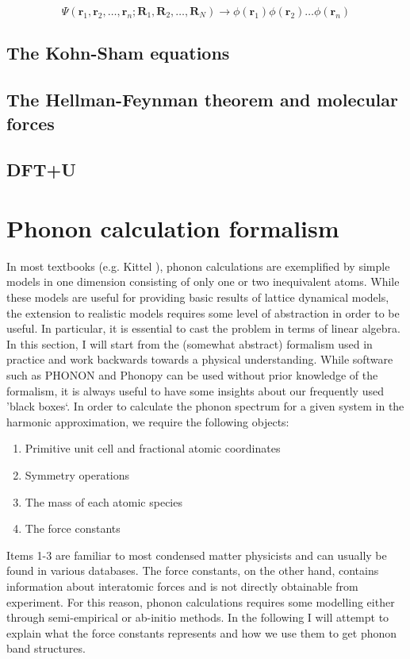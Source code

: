 \[ \Psi(\bm{r}_1,\bm{r}_2,\dots, \bm{r}_n; \bm{R}_1, \bm{R}_2, \dots , \bm{R}_N) \longrightarrow \phi(\bm{r}_1)\phi(\bm{r}_2)\dots\phi(\bm{r}_n) \]

\subsection{The Kohn-Sham equations}

\subsection{The Hellman-Feynman theorem and molecular forces}

\subsection{DFT+U}

\section{Phonon calculation formalism}
In most textbooks (e.g. Kittel \cite{Kittel2005}), phonon calculations are exemplified by simple models in one dimension consisting of only one or two inequivalent atoms. While these models are useful for providing basic results of lattice dynamical models, the extension to realistic models requires some level of abstraction in order to be useful. In particular, it is essential to cast the problem in terms of linear algebra. In this section, I will start from the (somewhat abstract) formalism used in practice and work backwards towards a physical understanding. While software such as PHONON \cite{Parlinski1997} and Phonopy \cite{Togo2015} can be used without prior knowledge of the formalism, it is always useful to have some insights about our frequently used 'black boxes`. In order to calculate the phonon spectrum for a given system in the harmonic approximation, we require the following objects:

\begin{enumerate}
	\item Primitive unit cell and fractional atomic coordinates
	\item Symmetry operations
	\item The mass of each atomic species
	\item The force constants
\end{enumerate}

Items 1-3 are familiar to most condensed matter physicists and can usually be found in various databases. The force constants, on the other hand, contains information about interatomic forces and is not directly obtainable from experiment. For this reason, phonon calculations requires some modelling either through semi-empirical or ab-initio methods. In the following I will attempt to explain what the force constants represents and how we use them to get phonon band structures.

